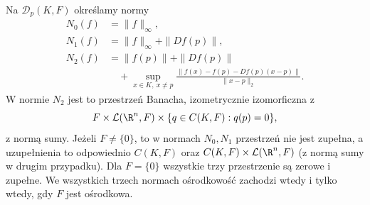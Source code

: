 \begin{twierdzenie}
\label{ma2:thm:point-differentiable-multidim}
Na $\mathcal D_p(K,F)$ określamy normy
\[
 \begin{aligned}
 N_0(f)&=\|f\|_\infty,\\
 N_1(f)&=\|f\|_\infty+\|Df(p)\|,\\
 N_2(f)&=\|f(p)\|+\|Df(p)\|\\
 &\quad+\sup_{x\in K,\ x\ne p}
 \frac{\|f(x)-f(p)-Df(p)(x-p)\|}{\|x-p\|_2}.
 \end{aligned}
\]
W normie $N_2$ jest to przestrzeń Banacha,
izometrycznie izomorficzna z
\[
 F\times\mathcal L(\R^n,F)\times
 \{q\in C(K,F):q(p)=0\},
\]
z normą sumy. Jeżeli $F\ne\{0\}$, to
w normach $N_0,N_1$ przestrzeń nie jest zupełna,
a uzupełnienia to odpowiednio $C(K,F)$
oraz $C(K,F)\times\mathcal L(\R^n,F)$
(z normą sumy w drugim przypadku).
Dla $F=\{0\}$ wszystkie trzy przestrzenie
są zerowe i zupełne.
We wszystkich trzech normach ośrodkowość
zachodzi wtedy i tylko wtedy, gdy $F$ jest ośrodkowa.
\end{twierdzenie}
